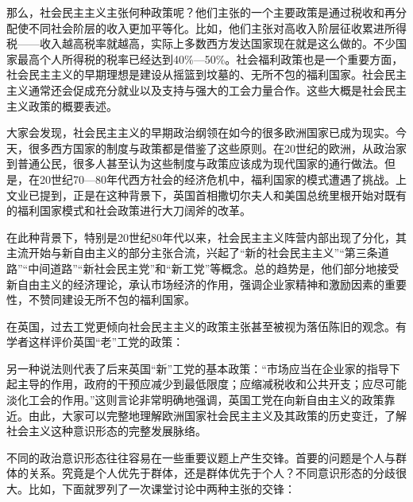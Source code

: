 那么，社会民主主义主张何种政策呢？他们主张的一个主要政策是通过税收和再分配使不同社会阶层的收入更加平等化。比如，他们主张对高收入阶层征收累进所得税——收入越高税率就越高，实际上多数西方发达国家现在就是这么做的。不少国家最高个人所得税的税率已经达到40\%—50\%。社会福利政策也是一个重要方面，社会民主主义的早期理想是建设从摇篮到坟墓的、无所不包的福利国家。社会民主主义通常还会促成充分就业以及支持与强大的工会力量合作。这些大概是社会民主主义政策的概要表述。

大家会发现，社会民主主义的早期政治纲领在如今的很多欧洲国家已成为现实。今天，很多西方国家的制度与政策都是借鉴了这些原则。在20世纪的欧洲，从政治家到普通公民，很多人甚至认为这些制度与政策应该成为现代国家的通行做法。但是，在20世纪70—80年代西方社会的经济危机中，福利国家的模式遭遇了挑战。上文业已提到，正是在这种背景下，英国首相撒切尔夫人和美国总统里根开始对既有的福利国家模式和社会政策进行大刀阔斧的改革。

在此种背景下，特别是20世纪80年代以来，社会民主主义阵营内部出现了分化，其主流开始与新自由主义的部分主张合流，兴起了“新的社会民主主义”“第三条道路”“中间道路”“新社会民主党”和“新工党”等概念。总的趋势是，他们部分地接受新自由主义的经济理论，承认市场经济的作用，强调企业家精神和激励因素的重要性，不赞同建设无所不包的福利国家。

在英国，过去工党更倾向社会民主主义的政策主张甚至被视为落伍陈旧的观念。有学者这样评价英国“老”工党的政策：


另一种说法则代表了后来英国“新”工党的基本政策：“市场应当在企业家的指导下起主导的作用，政府的干预应减少到最低限度；应缩减税收和公共开支；应尽可能淡化工会的作用。”这则言论非常明确地强调，英国工党在向新自由主义的政策靠近。由此，大家可以完整地理解欧洲国家社会民主主义及其政策的历史变迁，了解社会主义这种意识形态的完整发展脉络。


不同的政治意识形态往往容易在一些重要议题上产生交锋。首要的问题是个人与群体的关系。究竟是个人优先于群体，还是群体优先于个人？不同意识形态的分歧很大。比如，下面就罗列了一次课堂讨论中两种主张的交锋：

